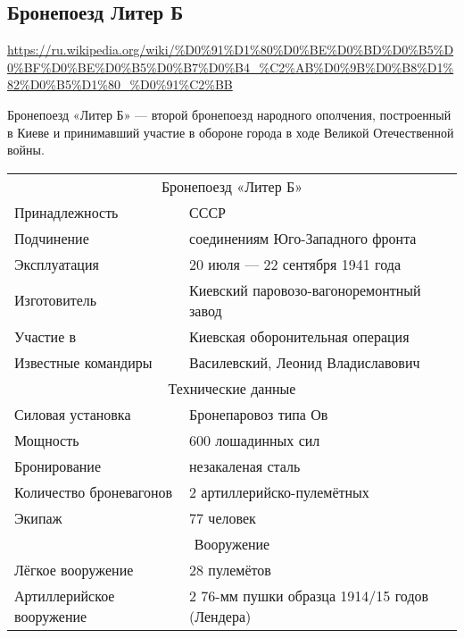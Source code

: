  
 
\subsection{Бронепоезд Литер Б}
\url{https://ru.wikipedia.org/wiki/%D0%91%D1%80%D0%BE%D0%BD%D0%B5%D0%BF%D0%BE%D0%B5%D0%B7%D0%B4_%C2%AB%D0%9B%D0%B8%D1%82%D0%B5%D1%80_%D0%91%C2%BB}
  
Бронепоезд «Литер Б» — второй бронепоезд народного ополчения, построенный в
Киеве и принимавший участие в обороне города в ходе Великой Отечественной
войны.  

\begin{longtable}{ll}
\multicolumn{2}{c}{Бронепоезд «Литер Б»} \\
Принадлежность      & СССР                                    \\
Подчинение          & соединениям Юго-Западного фронта        \\
Эксплуатация        & 20 июля — 22 сентября 1941 года         \\
Изготовитель        & Киевский паровозо-вагоноремонтный завод \\
Участие в           & Киевская оборонительная операция        \\
Известные командиры & Василевский, Леонид Владиславович       \\
\multicolumn{2}{c}{Технические данные}                  \\
Силовая установка       & Бронепаровоз типа Ов          \\
Мощность                & 600 лошадинных сил            \\
Бронирование            & незакаленая сталь             \\
Количество броневагонов & 2 артиллерийско-пулемётных    \\
Экипаж                  & 77 человек\cite{Kajnaran2012} \\
\multicolumn{2}{c}{Вооружение} \\
Лёгкое вооружение         & 28 пулемётов \cite{Kolomiec2010}\\
Артиллерийское вооружение & 
2 76-мм пушки образца 1914/15 годов (Лендера) \cite{Kajnaran2012,Kolomiec2010}\\
\end{longtable}
